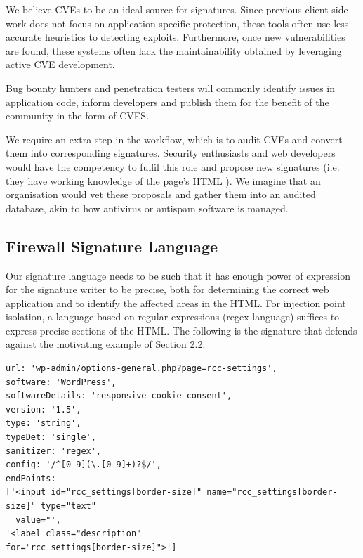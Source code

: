 We believe CVEs to be an ideal source for signatures. Since previous client-side work does not focus on application-specific protection, these tools often use less accurate heuristics to detecting exploits. Furthermore, once new vulnerabilities are found, these systems often lack the maintainability obtained by leveraging active CVE development. 

Bug bounty hunters and penetration testers will commonly identify issues in application code, inform developers and publish them for the benefit of the community in the form of CVES.

We require an extra step in the workflow, which is to audit CVEs and convert them into corresponding signatures. Security enthusiasts and web developers would have the competency to fulfil this role and propose new signatures (i.e. they have working knowledge of the page's HTML ). We imagine that an organisation would vet these proposals and gather them into an audited database, akin to how antivirus or antispam software is managed.

 
 \subsection{Firewall Signature Language} \label{signature_language}
 Our signature language needs to be such that it has enough power of expression for the signature writer to be precise, both for determining the correct web application and to identify the affected areas in the HTML. For injection point isolation, a language based on regular expressions (regex language) suffices to express precise sections of the HTML. The following is the signature that defends against the motivating example of Section 2.2:
\begin{lstlisting}[breaklines=true,caption={An \sys signature},label={lst:xsnare_signature}]
url: 'wp-admin/options-general.php?page=rcc-settings',
software: 'WordPress',
softwareDetails: 'responsive-cookie-consent',
version: '1.5',
type: 'string',
typeDet: 'single',
sanitizer: 'regex',
config: '/^[0-9](\.[0-9]+)?$/',
endPoints: 
['<input id="rcc_settings[border-size]" name="rcc_settings[border-size]" type="text"
  value="',
'<label class="description" 
for="rcc_settings[border-size]">']
\end{lstlisting}

